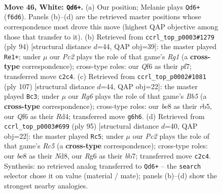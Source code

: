 \documentclass[11pt]{article}
\begin{document}
\clearpage

\begin{figure}[p]\centering
\begin{subfigure}{0.46\textwidth}\centering
\resizebox{\linewidth}{!}{%
\newchessgame
\chessboard[
  setfen={4b3/3k4/5QR1/3P4/8/r5p1/P1P1p1P1/4K3 w - - 1 46},
  showmover=false,
  pgfstyle=straightmove, color=movearrow, markmove={f6-d6}
]}
\caption{}
\end{subfigure}\hfill
\begin{subfigure}{0.46\textwidth}\centering
\resizebox{\linewidth}{!}{%
\newchessgame
\chessboard[
  setfen={8/5p1p/4b3/4k1P1/p1r5/K1P4R/8/6R1 w - - 13 48},
  showmover=false,
  pgfstyle=straightmove, color=movearrow, markmove={g1-e1}
]}
\caption{}
\end{subfigure}
\\[4pt]
\begin{subfigure}{0.46\textwidth}\centering
\resizebox{\linewidth}{!}{%
\newchessgame
\chessboard[
  setfen={8/3P4/4p3/1R2P3/pb1rk1pB/8/5PK1/8 b - - 0 54},
  showmover=false,
  pgfstyle=straightmove, color=movearrow, markmove={b4-c3}
]}
\caption{}
\end{subfigure}\hfill
\begin{subfigure}{0.46\textwidth}\centering
\resizebox{\linewidth}{!}{%
\newchessgame
\chessboard[
  setfen={3n4/1B4k1/p6p/P3P3/2r3Pp/1R5K/8/8 b - - 0 48},
  showmover=false,
  pgfstyle=straightmove, color=movearrow, markmove={c4-c5}
]}
\caption{}
\end{subfigure}
\caption{\textbf{Move 46, White: \texttt{Qd6+}.} (a) Our position; Melanie plays \texttt{Qd6+} (\texttt{f6d6}). Panels (b)--(d) are the retrieved master positions whose correspondence most drove this move (highest QAP objective among those that transfer to it). (b) Retrieved from \texttt{ccrl\_top\_p0003\#1279} (ply 94) [structural distance $d$=44, QAP obj=39]: the master played \texttt{Re1+}; under $\mu$ our \emph{Pc2} plays the role of that game's \emph{Rg1} (a \textbf{cross-type} correspondence); cross-type roles: our \emph{Q}f6 as their \emph{p}f7; transferred move \texttt{c2c4}. (c) Retrieved from \texttt{ccrl\_top\_p0002\#1081} (ply 107) [structural distance $d$=44, QAP obj=22]: the master played \texttt{Bc3}; under $\mu$ our \emph{Rg6} plays the role of that game's \emph{Bb5} (a \textbf{cross-type} correspondence); cross-type roles: our \emph{b}e8 as their \emph{r}b5, our \emph{Q}f6 as their \emph{R}d4; transferred move \texttt{g6h6}. (d) Retrieved from \texttt{ccrl\_top\_p0003\#699} (ply 95) [structural distance $d$=40, QAP obj=22]: the master played \texttt{Rc5}; under $\mu$ our \emph{Pc2} plays the role of that game's \emph{Rc5} (a \textbf{cross-type} correspondence); cross-type roles: our \emph{b}e8 as their \emph{N}d8, our \emph{R}g6 as their \emph{b}b7; transferred move \texttt{c2c4}. Synthesis: no retrieved analog transferred to \texttt{Qd6+} -- the \texttt{search} selector chose it on value (material / mate); panels (b)--(d) show the strongest nearby analogies.}
\label{fig:thought-m90}
\end{figure}
\end{document}
